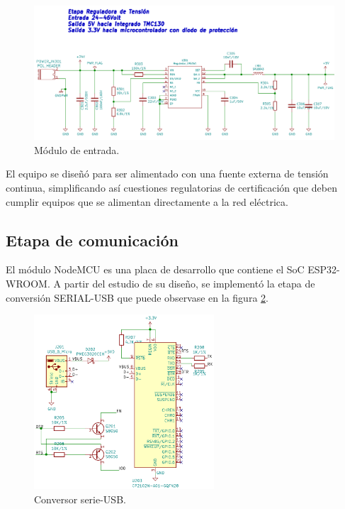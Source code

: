 \begin{figure}[h!]
	\centering
	\includegraphics[width=1\textwidth]{./Figures/kicad_tension_v2.png}
	\caption{Módulo de entrada.}
	\label{fig:kicad_tension}
\end{figure}
  
El equipo se diseñó para ser alimentado con una fuente externa de tensión continua, simplificando así cuestiones regulatorias de certificación que deben cumplir equipos que se alimentan directamente a la red eléctrica.

\subsection{Etapa de comunicación}

El módulo NodeMCU es una placa de desarrollo que contiene el SoC ESP32-WROOM. A partir del estudio de su diseño, se implementó la etapa de conversión SERIAL-USB que puede observase en la figura \ref{fig:kicad_conversor}. 


\begin{figure}[h!]
	\centering
	\includegraphics[width=0.6\textwidth]{./Figures/kicad_conversor_v1.png}
	\caption{Conversor serie-USB.}
	\label{fig:kicad_conversor}
\end{figure}

